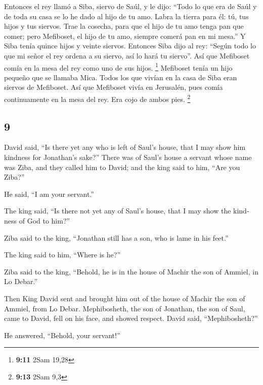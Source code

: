 \begin{paracol}{2}
 Entonces el rey llamó a Siba, siervo de Saúl, y le dijo:
``Todo lo que era de Saúl y de toda su casa se lo he dado al hijo de tu
amo.  Labra la tierra para él: tú, tus hijos y tus
siervos. Trae la cosecha, para que el hijo de tu amo tenga pan que
comer; pero Mefiboset, el hijo de tu amo, siempre comerá pan en mi
mesa.'' Y Siba tenía quince hijos y veinte siervos. 
Entonces Siba dijo al rey: ``Según todo lo que mi señor el rey ordena a
su siervo, así lo hará tu siervo''. Así que Mefiboset comía en la mesa
del rey como uno de sus hijos. \footnote{\textbf{9:11} 2Sam 19,28}
 Mefiboset tenía un hijo pequeño que se llamaba Mica.
Todos los que vivían en la casa de Siba eran siervos de Mefiboset.
 Así que Mefiboset vivía en Jerusalén, pues comía
continuamente en la mesa del rey. Era cojo de ambos pies. \footnote{\textbf{9:13}
  2Sam 9,3}

\switchcolumn
\begin{otherlanguage}{english}

\hypertarget{section-17}{%
\section{9}\label{section-17}}

 David said, ``Is there yet any who is left of Saul's
house, that I may show him kindness for Jonathan's sake?''
 There was of Saul's house a servant whose name was Ziba,
and they called him to David; and the king said to him, ``Are you
Ziba?''

He said, ``I am your servant.''

 The king said, ``Is there not yet any of Saul's house,
that I may show the kindness of God to him?''

Ziba said to the king, ``Jonathan still has a son, who is lame in his
feet.''

 The king said to him, ``Where is he?''

Ziba said to the king, ``Behold, he is in the house of Machir the son of
Ammiel, in Lo Debar.''

 Then King David sent and brought him out of the house of
Machir the son of Ammiel, from Lo Debar.  Mephibosheth,
the son of Jonathan, the son of Saul, came to David, fell on his face,
and showed respect. David said, ``Mephibosheth?''

He answered, ``Behold, your servant!''


\end{otherlanguage}
\end{paracol}
